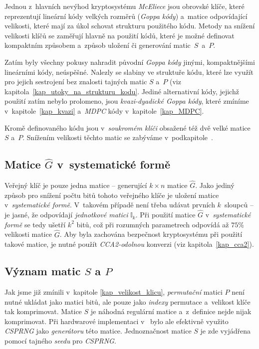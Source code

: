 \documentclass[thesis=M,czech,hidelinks]{FITthesis}[2012/06/26]
\newcommand{\0}{{\textcolor[gray]{0.75}{0}}}
\begin{document}
Jednou z~hlavních nevýhod kryptosystému \emph{McEliece} jsou obrovské klíče,
které reprezentují lineární kódy velkých rozměrů (\emph{Goppa kódy}) a~matice
odpovídající velikosti, které mají za úkol schovat strukturu použitého kódu.
Metody na snížení velikosti klíčů se zaměřují hlavně na použití kódů, které je
možné definovat kompaktním způsobem a~způsob uložení či generování
matic~$S$~a~$P$.

Zatím byly všechny pokusy nahradit původní \emph{Goppa kódy} jinými,
kompaktnějšími lineárními kódy, neúspěšné. Nalezly se slabiny ve struktuře kódu,
které lze využít pro jejich sestrojení bez znalosti tajných matic $S$ a~$P$ (viz
kapitola~\ref{kap_utoky_na_strukturu_kodu}. Jediné alternativní kódy, jejichž
použití zatím nebylo prolomeno, jsou \emph{kvazi-dyadické Goppa kódy}, které
zmíníme v~kapitole~\ref{kap_kvazi} a~\emph{MDPC} kódy v~kapitole~\ref{kap_MDPC}.

Kromě definovaného kódu jsou v~\emph{soukromém klíči} obsažené též dvě velké
matice $S$ a~$P$. Snížením velikosti těchto matic se zabýváme v~podkapitole~.


\subsection{Matice $\hat{G}$ v~systematické formě}

Veřejný klíč je pouze jedna matice --  generující $k \times n$
matice $\hat{G}$. Jako jediný způsob pro snížení počtu bitů tohoto veřejného
klíče je uložení matice v~\emph{systematické formě}. V~takovém případě není
třeba udávat prvních $k$~sloupců -- je jasné, že odpovídají \emph{jednotkové
matici} $\mathbb{I}_k$. Při použití matice $\hat{G}$ v~\emph{systematické formě}
se tedy ušetří $k^2$ bitů, což při rozumných parametrech odpovídá až $75$\;\%
velikosti matice $\hat{G}$. Aby byla zachována bezpečnost kryptosystému při
použití takové matice, je nutné použít \emph{CCA2-odolnou} konverzi (viz
kapitola~\ref{kap_cca2}).


\subsection{Význam matic $S$ a $P$}

Jak jsme již zmínili v~kapitole \ref{kap_velikost_klicu}, \emph{permutační}
matici $P$ není nutné ukládat jako matici bitů, ale pouze jako \emph{indexy}
permutace a~velikost klíče tak komprimovat. Matice $S$ je náhodná regulární
matice a~z~definice nejde nijak komprimovat. Při hardwarové implementaci
v~\cite{Paustjan} bylo ale efektivně využito \emph{CSPRNG} jako
\emph{generátoru} této matice. Jednoznačnost matice $S$ je zde vyjádřena pomocí
tajného \emph{seedu} pro \emph{CSPRNG}.
\end{document}

